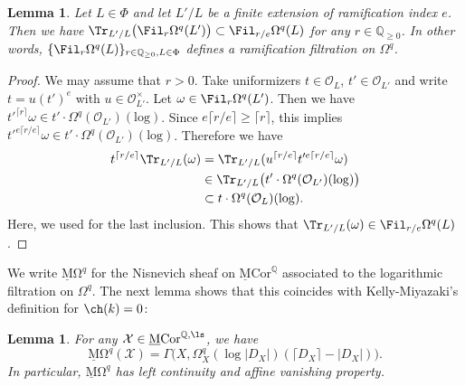 \documentclass{amsart}
\theoremstyle{plain}
\newtheorem{lemma}[theorem]{Lemma}
\theoremstyle{definition}
\theoremstyle{remark}
\numberwithin{equation}{section}
\def\ceil#1{\lceil #1 \rceil}
\def\logrm{\mathrm{log}}
\def\MCor{\mathrm{\underline{M}Cor}}
\def\MOmega{\mathrm{\underline{M}\Omega}}
\begin{document}
\begin{lemma}\label{omega_trace_axiom}
	Let $L\in \Phi$ and let $L'/L$ be a finite extension of ramification index $e$.
	Then we have $\Tr_{L'/L}\bigl(\Fil_r\Omega^q(L')\bigr)\subset \Fil_{r/e}\Omega^q(L)$ for any $r\in \mathbb{Q}_{\geq 0}$.
    In other words, $\{\Fil_r\Omega^q(L)\}_{r\in \mathbb{Q}_{\geq 0},L\in \Phi}$ defines a ramification filtration on $\Omega^q$.
\end{lemma}

\begin{proof}
    We may assume that $r>0$.
    Take uniformizers $t\in \mathcal{O}_L$, $t'\in \mathcal{O}_{L'}$ and write $t=u(t')^e$ with $u\in \mathcal{O}_{L'}^\times$.
    Let $\omega\in \Fil_r \Omega^q(L')$.
    Then we have $t'^{\ceil{r}}\omega\in t'\cdot \Omega^q(\mathcal{O}_{L'})(\logrm)$.
    Since $e\ceil{r/e}\geq \ceil{r}$, this implies $t'^{e\ceil{r/e}}\omega\in t'\cdot \Omega^q(\mathcal{O}_{L'})(\logrm)$.
    Therefore we have
	\begin{align*}
		t^{\ceil{r/e}}\Tr_{L'/L}(\omega)&{}=\Tr_{L'/L}(u^{\ceil{r/e}}t'^{e\ceil{r/e}}\omega)\\
		&{}\in \Tr_{L'/L}\bigl(t'\cdot \Omega^q(\mathcal{O}_{L'})(\logrm)\bigr)\\
            &{}\subset t\cdot \Omega^q(\mathcal{O}_L)(\logrm).
	\end{align*}
    Here, we used  for the last inclusion.
    This shows that $\Tr_{L'/L}(\omega)\in \Fil_{r/e}\Omega^q(L)$.
\end{proof}

We write $\MOmega^q$ for the Nisnevich sheaf on $\MCor^\mathbb{Q}$ associated to the logarithmic filtration on $\Omega^q$.
The next lemma shows that this coincides with Kelly-Miyazaki's definition for $\ch(k)=0$:

\begin{lemma}\label{omega_log_formula}
	For any $\mathcal{X}\in \MCor^{\mathbb{Q},\ls}$, we have
	$$
		\MOmega^q(\mathcal{X})=\Gamma\bigl(X,\Omega^q_X(\log |D_X|)(\ceil{D_X}-|D_X|)\bigr).
	$$
	In particular, $\MOmega^q$ has left continuity and affine vanishing property.
\end{lemma}
\end{document}
